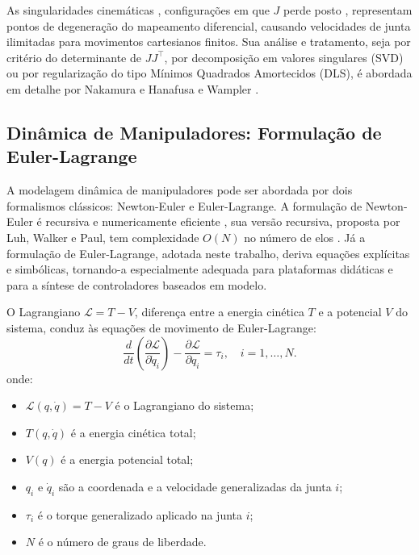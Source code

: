 As singularidades cinemáticas , configurações em que $J$ perde posto , representam pontos de degeneração do mapeamento diferencial, causando velocidades de junta ilimitadas para movimentos cartesianos finitos. Sua análise e tratamento, seja por critério do determinante de $JJ^\top$, por decomposição em valores singulares (SVD) \cite{golub2013matrix} ou por regularização do tipo Mínimos Quadrados Amortecidos (DLS), é abordada em detalhe por Nakamura e Hanafusa \cite{nakamura1986inverse} e Wampler \cite{wampler2007manipulator}.

\subsection{Dinâmica de Manipuladores: Formulação de Euler-Lagrange}

A modelagem dinâmica de manipuladores pode ser abordada por dois formalismos clássicos: Newton-Euler e Euler-Lagrange. A formulação de Newton-Euler é recursiva e numericamente eficiente , sua versão recursiva, proposta por Luh, Walker e Paul, tem complexidade $O(N)$ no número de elos \cite{luh1980online}. Já a formulação de Euler-Lagrange, adotada neste trabalho, deriva equações explícitas e simbólicas, tornando-a especialmente adequada para plataformas didáticas e para a síntese de controladores baseados em modelo.

O Lagrangiano $\mathcal{L} = T - V$, diferença entre a energia cinética $T$ e a potencial $V$ do sistema, conduz às equações de movimento de Euler-Lagrange:
\begin{equation}
    \frac{d}{dt}\left(\frac{\partial \mathcal{L}}{\partial \dot{q}_i}\right) - \frac{\partial \mathcal{L}}{\partial q_i} = \tau_i, \quad i = 1, \ldots, N.
    \label{eq:euler_lagrange}
\end{equation}
onde:
\begin{itemize}
    \item $\mathcal{L}(q,\dot{q}) = T - V$ é o Lagrangiano do sistema;
    \item $T(q,\dot{q})$ é a energia cinética total;
    \item $V(q)$ é a energia potencial total;
    \item $q_i$ e $\dot{q}_i$ são a coordenada e a velocidade generalizadas da junta $i$;
    \item $\tau_i$ é o torque generalizado aplicado na junta $i$;
    \item $N$ é o número de graus de liberdade.
\end{itemize}

